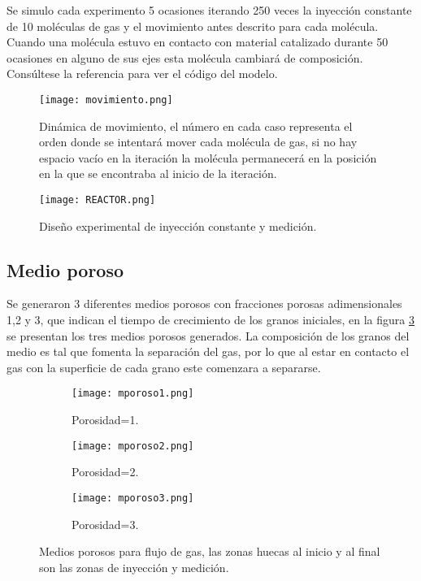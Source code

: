 \documentclass{article}
\begin{document}
Se simulo cada experimento 5 ocasiones iterando 250 veces la inyección constante de 10 moléculas de gas y el movimiento antes descrito para cada molécula. Cuando una molécula estuvo en contacto con material catalizado durante 50 ocasiones en alguno de sus ejes esta molécula cambiará de composición. Consúltese la referencia \citep{REPOPPF} para ver el código del modelo.
\begin{figure}[]
     \centering 
         \texttt{[image: movimiento.png]}
     \caption{Dinámica de movimiento, el número en cada caso representa el orden donde se intentará mover cada molécula de gas, si no hay espacio vacío en la iteración la molécula permanecerá en la posición en la que se encontraba al inicio de la iteración.}
        \label{movimiento}
\end{figure}
\begin{figure}[]
     \centering 
         \texttt{[image: REACTOR.png]}
     \caption{Diseño experimental de inyección constante y medición.}
        \label{reactor}
\end{figure}
\subsection{Medio poroso}
Se generaron 3 diferentes medios porosos con fracciones porosas adimensionales 1,2 y 3, que indican el tiempo de crecimiento de los granos iniciales, en la figura \ref{medioporoso} se presentan los tres medios porosos generados. La composición de los granos del medio es tal que fomenta la separación del gas, por lo que al estar en contacto el gas con la superficie de cada grano este comenzara a separarse.
\begin{figure}
\centering
     \begin{subfigure}[]{.3\linewidth}
         \texttt{[image: mporoso1.png]}
         \caption{Porosidad=1.}
        
     \end{subfigure}
     \begin{subfigure}[]{.3\linewidth}
         \texttt{[image: mporoso2.png]}
         \caption{Porosidad=2.}
       
     \end{subfigure}
      \begin{subfigure}[]{.3\linewidth}
         \texttt{[image: mporoso3.png]}
         \caption{Porosidad=3.}
        
     \end{subfigure}
     \caption{Medios porosos para flujo de gas, las zonas huecas al inicio y al final son las zonas de inyección y medición.}
        \label{medioporoso}
\end{figure}
\end{document}
